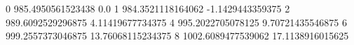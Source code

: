 0 985.4950561523438 0.0
1 984.3521118164062 -1.1429443359375
2 989.6092529296875 4.11419677734375
4 995.2022705078125 9.70721435546875
6 999.2557373046875 13.76068115234375
8 1002.6089477539062 17.1138916015625
